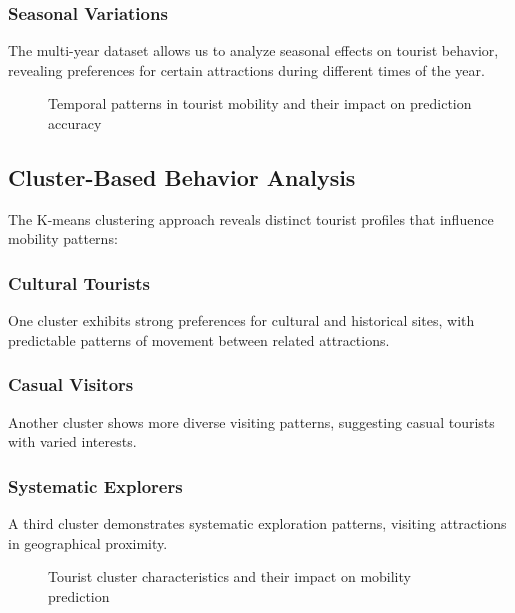 \documentclass[12pt,a4paper]{article}
\begin{document}
\subsubsection{Seasonal Variations}
The multi-year dataset allows us to analyze seasonal effects on tourist behavior, revealing preferences for certain attractions during different times of the year.

\begin{figure}[H]
\centering
\caption{Temporal patterns in tourist mobility and their impact on prediction accuracy}
\label{fig:temporal_analysis}
\end{figure}

\subsection{Cluster-Based Behavior Analysis}

The K-means clustering approach reveals distinct tourist profiles that influence mobility patterns:

\subsubsection{Cultural Tourists}
One cluster exhibits strong preferences for cultural and historical sites, with predictable patterns of movement between related attractions.

\subsubsection{Casual Visitors}
Another cluster shows more diverse visiting patterns, suggesting casual tourists with varied interests.

\subsubsection{Systematic Explorers}
A third cluster demonstrates systematic exploration patterns, visiting attractions in geographical proximity.

\begin{figure}[H]
\centering
\caption{Tourist cluster characteristics and their impact on mobility prediction}
\label{fig:cluster_analysis}
\end{figure}
\end{document}
